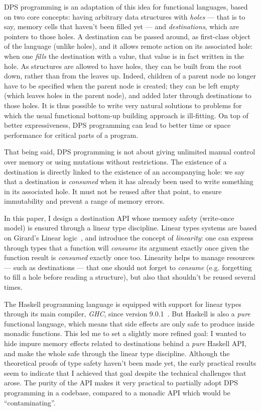 \documentclass[english]{jflart}
\begin{document}
DPS programming is an adaptation of this idea for functional languages, based on two core concepts: having arbitrary data structures with \emph{holes} --- that is to say, memory cells that haven't been filled yet --- and \emph{destinations}, which are pointers to those holes. A destination can be passed around, as first-class object of the language (unlike holes), and it allows remote action on its associated hole: when one \emph{fills} the destination with a value, that value is in fact written in the hole. As structures are allowed to have holes, they can be built from the root down, rather than from the leaves up. Indeed, children of a parent node no longer have to be specified when the parent node is created; they can be left empty (which leaves holes in the parent node), and added later through destinations to those holes. It is thus possible to write very natural solutions to problems for which the usual functional bottom-up building approach is ill-fitting. On top of better expressiveness, DPS programming can lead to better time or space performance for critical parts of a program.

That being said, DPS programming is not about giving unlimited manual control over memory or using mutations without restrictions. The existence of a destination is directly linked to the existence of an accompanying hole: we say that a destination is \emph{consumed} when it has already been used to write something in its associated hole. It must not be reused after that point, to ensure immutability and prevent a range of memory errors.

In this paper, I design a destination API whose memory safety (write-once model) is ensured through a linear type discipline. Linear types systems are based on Girard's Linear logic~\cite{girard_linear_1995}, and introduce the concept of \emph{linearity}: one can express through types that a function will \emph{consume} its argument exactly once given the function result is \emph{consumed} exactly once too. Linearity helps to manage resources --- such as destinations --- that one should not forget to \emph{consume} (e.g. forgetting to fill a hole before reading a structure), but also that shouldn't be reused several times.

The Haskell programming language is equipped with support for linear types through its main compiler, \emph{GHC}, since version 9.0.1~\cite{bernardy_linear_2018}. But Haskell is also a \emph{pure} functional language, which means that side effects are only safe to produce inside monadic functions. This led me to set a slightly more refined goal: I wanted to hide impure memory effects related to destinations behind a \emph{pure} Haskell API, and make the whole safe through the linear type discipline. Although the theoretical proofs of type safety haven't been made yet, the early practical results seem to indicate that I achieved that goal despite the technical challenges that arose. The purity of the API makes it very practical to partially adopt DPS programming in a codebase, compared to a monadic API which would be ``contaminating''.
\end{document}

